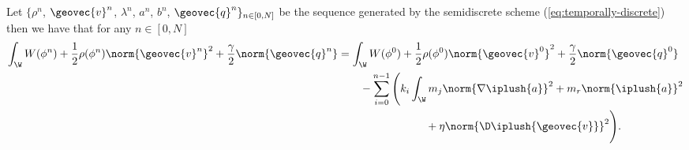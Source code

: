 \documentclass[final]{amsart}
\numberwithin{equation}{section}
\begin{document}
\begin{The}
  \label{the:temp-discrete-energy}
  Let $\{\rho^{n}$, ${\geovec{v}}^{n}$, $\lambda^{n}$, $a^{n}$, $b^{n}$,
  ${\geovec{q}}^{n}\}_{n\in [0, N]}$ be the sequence generated by the
  semidiscrete scheme (\ref{eq:temporally-discrete}) then we have that
  for any $n \in [0,N]$
  \begin{equation}
    \label{eq:inductive-hyp}
    \begin{split}
      \int_\W W(\phi^n) + \frac{1}{2}\rho(\phi^n) \norm{{\geovec{v}}^n}^2 +
      \frac{\gamma}{2} \norm{{\geovec{q}}^n}
      &= \int_\W W(\phi^0) +
      \frac{1}{2}\rho(\phi^0) \norm{{\geovec{v}}^0}^2 + \frac{\gamma}{2}
      \norm{{\geovec{q}}^0} 
      \\&\qquad - \sum_{i=0}^{n-1} \Bigg( k_i \int_\W m_j
        \norm{\nabla \iplush{a}}^2 + m_r \norm{\iplush{a}}^2 \\
        &\qquad \qquad \qquad \qquad + \eta
        \norm{\D \iplush{{\geovec{v}}}}^2 \Bigg).
    \end{split}
  \end{equation}
\end{The}
\end{document}
